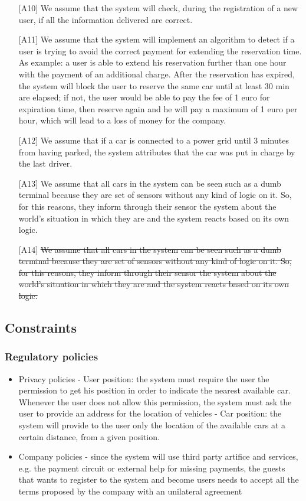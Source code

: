 \documentclass[10pt, a4paper,titlepage]{article}
\begin{document}
\begin{itemize}
\item [{[A10]}] We assume that the system will check, during the registration of a new user, if all the information delivered are correct.
\item [{[A11]}] We assume that the system will implement an algorithm to detect if a user is trying to avoid the correct payment for extending the reservation time. As example: a user is able to extend his reservation further than one hour with the payment of an additional charge. After the reservation has expired, the system will block the user to reserve the same car until at least 30 min are elapsed; if not, the user would be able to pay the fee of 1 euro for expiration time, then reserve again and he will pay a maximum of 1 euro per hour, which will lead to a loss of money for the company.
\item [{[A12]}] We assume that if a car is connected to a power grid until 3 minutes from having parked, the system attributes that the car was put in charge by the last driver.
\item [{[A13]}] We assume that all cars in the system can be seen such as a dumb terminal because they are set of sensors without any kind of logic on it. So, for this reasons, they inform through their sensor the system about the world's situation in which they are and the system reacts based on its own logic.
\item [{[A14]}] \sout{We assume that all cars in the system can be seen such as a dumb terminal because they are set of sensors without any kind of logic on it. So, for this reasons, they inform through their sensor the system about the world's situation in which they are and the system reacts based on its own logic.}
\end{itemize}
\subsection{Constraints}
\subsubsection{Regulatory policies}
\begin{itemize}
\item Privacy policies
\subitem - User position: the system must require the user the permission to get his position in order to indicate the nearest available car. Whenever the user does not allow this permission, the system must ask the user to provide an address for the location of vehicles
\subitem - Car position: the system will provide to the user only the location of the available cars at a certain distance, from a given position.
\item Company policies
\subitem - since the system will use third party artifice and services, e.g. the payment circuit or external help for missing payments, the guests that wants to register to the system and become users needs to accept all the terms proposed by the company with an unilateral agreement
\end{itemize}
\end{document}
